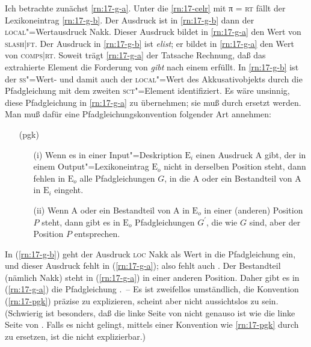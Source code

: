 \documentclass[output=paper]{LSP/langsci}
\begin{document}
\randnum\label{rn:17-56}Ich betrachte zunächst \eqref{rn:17-g-a}. Unter die \eqref{rn:17-celr} mit π = \textsc{rt} fällt der Lexikoneintrag \eqref{rn:17-g-b}. Der Ausdruck  ist in \eqref{rn:17-g-b} dann der \textsc{local}"=Wertausdruck {\glqq}Nakk{\grqq}. Dieser Ausdruck bildet in \eqref{rn:17-g-a} den Wert von \textsc{slash|ft}. Der Ausdruck  in \eqref{rn:17-g-b} ist {\glqq}\textit{elist}{\grqq}; er bildet in \eqref{rn:17-g-a} den Wert von \textsc{comps|rt}. Soweit trägt \eqref{rn:17-g-a} der Tatsache Rechnung, daß das extrahierte Element die Forderung von \textit{gibt} nach einem  erfüllt. In \eqref{rn:17-g-b} ist der \textsc{ss}"=Wert- und damit auch der \textsc{local}"=Wert des Akkusativobjekts durch die Pfadgleichung  mit dem zweiten \textsc{sct}"=Element identifiziert. Es wäre unsinnig, diese Pfadgleichung in \eqref{rn:17-g-a} zu übernehmen; sie muß durch  ersetzt werden. Man muß dafür eine Pfadgleichungskonvention folgender Art annehmen:
\begin{enumerate}
\item[(pgk)]\label{rn:17-pgk}
\begin{enumerate}
\item[(i)]Wenn es in einer Input"=Deskription $\mathrm{E}_i$ einen
  Ausdruck A gibt, der in einem Output"=Lexikoneintrag $\mathrm{E}_o$
  nicht in derselben Position steht, dann fehlen in $\mathrm{E}_o$ alle
  Pfadgleichungen $G$, in die A oder ein Bestandteil von A in $\mathrm{E}_i$
  eingeht.
\item[(ii)]Wenn A oder ein Bestandteil von A in $\mathrm{E}_o$ in
  einer (anderen) Position $P$ steht, dann gibt es in $\mathrm{E}_o$
  Pfadgleichungen $G^{\prime}$, die wie $G$ sind, aber der Position
  $P$ entsprechen.
\end{enumerate}
\end{enumerate}
\randnum\label{rn:17-57}In (\ref{rn:17-g-b}) geht der Ausdruck
{\glqq}\textsc{loc} Nakk{\grqq} als Wert in die Pfadgleichung
 ein, und dieser Ausdruck fehlt in (\ref{rn:17-g-a}); also
fehlt auch . Der Bestandteil  (nämlich
{\glqq}Nakk{\grqq}) steht in (\ref{rn:17-g-a}) in einer anderen
Position. Daher gibt es in (\ref{rn:17-g-a}) die Pfadgleichung
.~-- Es ist zweifellos umständlich, die
Konvention (\ref{rn:17-pgk}) präzise zu
explizieren, scheint aber nicht aussichtslos zu sein. (Schwierig ist
besonders, daß die linke Seite von  nicht genauso ist wie
die linke Seite von . Falls es nicht gelingt,
mittels einer Konvention wie \eqref{rn:17-pgk}  durch
 zu ersetzen, ist die  nicht
explizierbar.)
\end{document}
